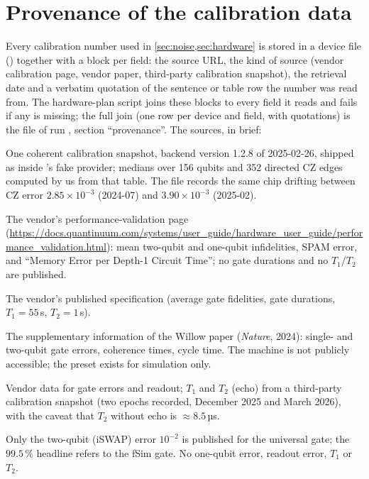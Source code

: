\section{Provenance of the calibration data}
\label{app:provenance}

Every calibration number used in \cref{sec:noise,sec:hardware} is stored in a device file
() together with a \code{[[provenance]]} block per field:
the source URL, the kind of source (vendor calibration page, vendor paper, third-party
calibration snapshot), the retrieval date and a verbatim quotation of the sentence or table
row the number was read from.  The hardware-plan script joins these blocks to every field it
reads and fails if any is missing; the full join (one row per device and field, with quotations)
is the file  of run , section
``provenance''.  The sources, in
brief:

\begin{description}[leftmargin=1.2em,style=nextline,itemsep=2pt]
\item[IBM Fez (Heron r2).]  One coherent calibration snapshot, backend version 1.2.8 of
2025-02-26, shipped as  inside 's fake provider;
medians over 156 qubits and 352 directed CZ edges computed by us from that table.  The file
records the same chip drifting between CZ error $2.85\times10^{-3}$ (2024-07) and
$3.90\times10^{-3}$ (2025-02).
\item[Quantinuum H1-1, H2-1.]  The vendor's performance-validation page
(\url{https://docs.quantinuum.com/systems/user_guide/hardware_user_guide/performance_validation.html}):
mean two-qubit and one-qubit infidelities, SPAM error, and ``Memory Error per Depth-1 Circuit
Time''; no gate durations and no $T_1$/$T_2$ are published.
\item[IonQ Forte.]  The vendor's published specification (average gate fidelities, gate
durations, $T_1 = 55$\,s, $T_2 = 1$\,s).
\item[Google Willow.]  The supplementary information of the Willow paper
(\emph{Nature}, 2024): single- and two-qubit gate errors, coherence times, cycle time.  The
machine is not publicly accessible; the preset exists for simulation only.
\item[IQM Garnet.]  Vendor data for gate errors and readout; $T_1$ and $T_2$ (echo) from a
third-party calibration snapshot (two epochs recorded, December 2025 and March 2026), with the
caveat that $T_2$ without echo is $\approx 8.5$\,µs.
\item[Rigetti Ankaa-3.]  Only the two-qubit (iSWAP) error $10^{-2}$ is published for the
universal gate; the $99.5\,\%$ headline refers to the fSim gate.  No one-qubit error, readout
error, $T_1$ or $T_2$.
\end{description}

